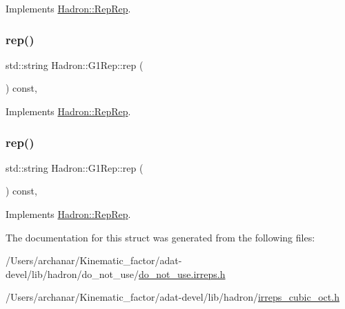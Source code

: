Implements \mbox{\hyperlink{structHadron_1_1RepRep_ab3213025f6de249f7095892109575fde}{Hadron\+::\+Rep\+Rep}}.

\mbox{\label{structHadron_1_1G1Rep_a2da49f8741322aebd7903da15cb9b751}} 
\subsubsection{\texorpdfstring{rep()}{rep()}\hspace{0.1cm}{\footnotesize\ttfamily [4/5]}}
{\footnotesize\ttfamily std\+::string Hadron\+::\+G1\+Rep\+::rep (\begin{DoxyParamCaption}{ }\end{DoxyParamCaption}) const\hspace{0.3cm}{\ttfamily [inline]}, {\ttfamily [virtual]}}



Implements \mbox{\hyperlink{structHadron_1_1RepRep_ab3213025f6de249f7095892109575fde}{Hadron\+::\+Rep\+Rep}}.

\mbox{\label{structHadron_1_1G1Rep_a2da49f8741322aebd7903da15cb9b751}} 
\subsubsection{\texorpdfstring{rep()}{rep()}\hspace{0.1cm}{\footnotesize\ttfamily [5/5]}}
{\footnotesize\ttfamily std\+::string Hadron\+::\+G1\+Rep\+::rep (\begin{DoxyParamCaption}{ }\end{DoxyParamCaption}) const\hspace{0.3cm}{\ttfamily [inline]}, {\ttfamily [virtual]}}



Implements \mbox{\hyperlink{structHadron_1_1RepRep_ab3213025f6de249f7095892109575fde}{Hadron\+::\+Rep\+Rep}}.



The documentation for this struct was generated from the following files\+:\begin{DoxyCompactItemize}
\item 
/\+Users/archanar/\+Kinematic\+\_\+factor/adat-\/devel/lib/hadron/do\+\_\+not\+\_\+use/\mbox{\hyperlink{adat-devel_2lib_2hadron_2do__not__use_2do__not__use_8irreps_8h}{do\+\_\+not\+\_\+use.\+irreps.\+h}}\item 
/\+Users/archanar/\+Kinematic\+\_\+factor/adat-\/devel/lib/hadron/\mbox{\hyperlink{adat-devel_2lib_2hadron_2irreps__cubic__oct_8h}{irreps\+\_\+cubic\+\_\+oct.\+h}}\end{DoxyCompactItemize}
